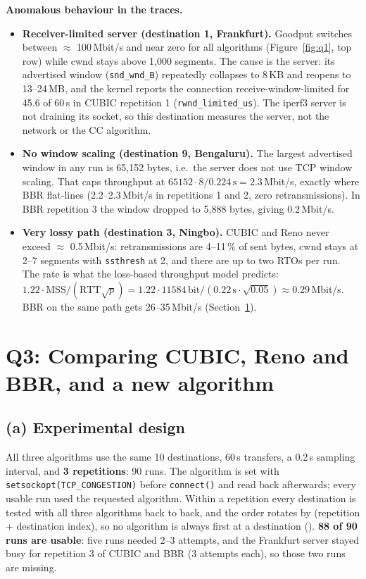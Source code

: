 \documentclass[10pt]{article}
\newcommand{\repo}{https://github.com/philwisniewski/cs-422-assignment-2}
\newcommand{\commit}{d1408ba303b1e3132ba5504e32ebf2ed3572d4e0}
\newcommand{\src}[4]{\href{\repo/blob/\commit/#1\#L#2-L#3}{\texttt{\detokenize{#4}}}}
\begin{document}
\textbf{Anomalous behaviour in the traces.}
\begin{itemize}
\item \textbf{Receiver-limited server (destination 1, Frankfurt).} Goodput switches between $\approx$ 100\,Mbit/s and near zero for all algorithms (Figure~\ref{fig:q1}, top row) while cwnd stays above 1,000 segments. The cause is the server: its advertised window (\texttt{snd\_wnd\_B}) repeatedly collapses to 8\,KB and reopens to 13--24\,MB, and the kernel reports the connection receive-window-limited for 45.6 of 60\,s in CUBIC repetition 1 (\texttt{rwnd\_limited\_us}). The iperf3 server is not draining its socket, so this destination measures the server, not the network or the CC algorithm.
\item \textbf{No window scaling (destination 9, Bengaluru).} The largest advertised window in any run is 65,152 bytes, i.e.\ the server does not use TCP window scaling. That caps throughput at $65152 \cdot 8 / 0.224\,\text{s} = 2.3$\,Mbit/s, exactly where BBR flat-lines (2.2--2.3\,Mbit/s in repetitions 1 and 2, zero retransmissions). In BBR repetition 3 the window dropped to 5,888 bytes, giving 0.2\,Mbit/s.
\item \textbf{Very lossy path (destination 3, Ningbo).} CUBIC and Reno never exceed $\approx$ 0.5\,Mbit/s: retransmissions are 4--11\,\% of sent bytes, cwnd stays at 2--7 segments with \texttt{ssthresh} at 2, and there are up to two RTOs per run. The rate is what the loss-based throughput model predicts: $1.22\cdot\text{MSS}/(\text{RTT}\sqrt{p}) = 1.22\cdot 11584\,\text{bit}/(0.22\,\text{s}\cdot\sqrt{0.05}) \approx 0.29$\,Mbit/s. BBR on the same path gets 26--35\,Mbit/s (Section~\ref{sec:q3}).
\end{itemize}

\clearpage
\section{Q3: Comparing CUBIC, Reno and BBR, and a new algorithm}
\label{sec:q3}

\subsection{(a) Experimental design}

All three algorithms use the same 10 destinations, 60\,s transfers, a 0.2\,s sampling interval, and \textbf{3 repetitions}: 90 runs. The algorithm is set with \texttt{setsockopt(TCP\_CONGESTION)} before \texttt{connect()} and read back afterwards; every usable run used the requested algorithm. Within a repetition every destination is tested with all three algorithms back to back, and the order rotates by (repetition + destination index), so no algorithm is always first at a destination (\src{run_experiments.py}{168}{222}{run_experiments}). \textbf{88 of 90 runs are usable}: five runs needed 2--3 attempts, and the Frankfurt server stayed busy for repetition 3 of CUBIC and BBR (3 attempts each), so those two runs are missing.
\end{document}
